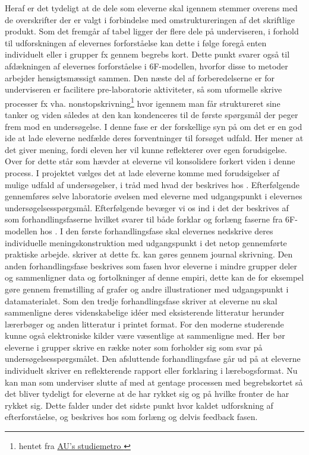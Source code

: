 Heraf er det tydeligt at de dele som eleverne skal igennem stemmer overens med de overskrifter der er valgt i forbindelse med omstruktureringen af det skriftlige produkt. Som det fremgår af tabel  ligger der flere dele på underviseren, i forhold til udforskningen af elevernes forforståelse kan dette i følge \citet{Hand2004} foregå enten individuelt eller i grupper fx gennem begrebs kort. Dette punkt svarer også til afdækningen af elevernes forforståelse i 6F-modellen, hvorfor disse to metoder arbejder hensigtsmæssigt sammen. Den næste del af forberedelserne er for underviseren er facilitere pre-laboratorie aktiviteter, så som uformelle skrive processer fx vha. nonstopskrivning\footnote{hentet fra \href{http://studypedia.au.dk/fileadmin/www.studiemetro.au.dk/Pink__At_skrive_universitetsopgaver/nonstop/nonstop.html}{AU's studiemetro }} hvor igennem man får struktureret sine tanker og viden således at den kan kondenceres til de første spørgsmål der peger frem mod en undersøgelse.
I denne fase er der forskellige syn på om det er en god ide at lade eleverne nedfælde deres forventninger til forsøget udfald. Her mener \citep{Hand2004, Burke2005, Greenbowe2005} at det giver mening, fordi eleven her vil kunne reflekterer over egen forudsigelse. Over for dette står \citet{Etkina2007} som hævder at eleverne vil konsolidere forkert viden i denne process. I projektet vælges det at lade eleverne komme med forudsigelser af mulige udfald af undersøgelser, i tråd med hvad der beskrives hos \citep{Hand2004, Burke2005, Greenbowe2005}. Efterfølgende gennemføres selve laboratorie øvelsen med eleverne med udgangspunkt i elevernes undersøgelsesspørgsmål. Efterfølgende bevæger vi os ind i det der beskrives af \citet{Keys1999,Hand2004} som forhandlingsfaserne hvilket svarer til både forklar og forlæng faserne fra 6F-modellen hos \citep{Dolin2014}. I den første forhandlingsfase skal elevernes nedskrive deres individuelle meningskonstruktion med udgangspunkt i det netop gennemførte praktiske arbejde. \citet{Hand2004} skriver at dette fx. kan gøres gennem journal skrivning. Den anden forhandlingsfase beskrives som fasen hvor eleverne i mindre grupper deler og sammenligner data og fortolkninger af denne empiri, dette kan de for eksempel gøre gennem fremstilling af grafer og andre illustrationer med udgangspunkt i datamaterialet. Som den tredje forhandlingsfase skriver \citet{Hand2004} at eleverne nu skal sammenligne deres videnskabelige idéer med eksisterende litteratur herunder lærerbøger og anden litteratur i printet format. For den moderne studerende kunne også elektroniske kilder være væsentlige at sammenligne med. Her bør eleverne i grupper skrive en række noter som forholder sig som svar på undersøgelsesspørgsmålet. Den afsluttende forhandlingsfase går ud på at eleverne individuelt skriver en reflekterende rapport eller forklaring i lærebogsformat.
Nu kan man som underviser slutte af med at gentage processen med begrebskortet så det bliver tydeligt for eleverne at de har rykket sig og på hvilke fronter de har rykket sig. Dette falder under det sidste punkt hvor kaldet udforskning af efterforståelse, og beskrives hos \citet{Dolin2014} som forlæng og delvis feedback fasen.


